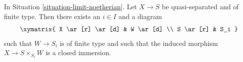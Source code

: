 \begin{lemma}
\label{lemma-good-diagram}
In Situation \ref{situation-limit-noetherian}.
Let $X \to S$ be quasi-separated and of finite type.
Then there exists an $i \in I$ and a diagram
\begin{equation}
\label{equation-good-diagram}
\vcenter{
\xymatrix{
X \ar[r] \ar[d] & W \ar[d] \\
S \ar[r] & S_i
}
}
\end{equation}
such that $W \to S_i$ is of finite type and such that
the induced morphism $X \to S \times_{S_i} W$ is a closed
immersion.
\end{lemma}
